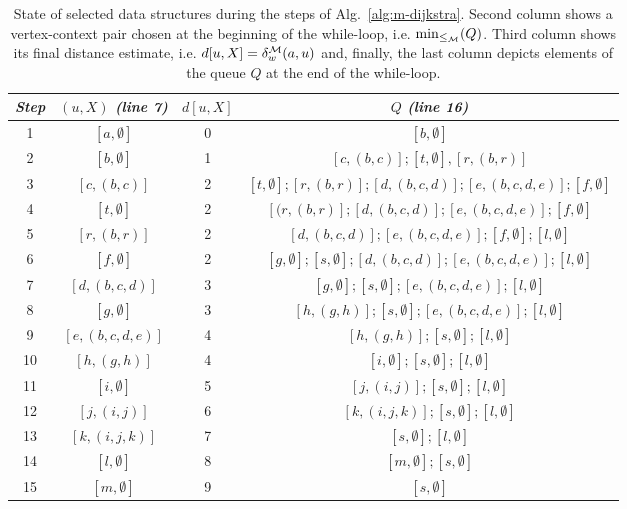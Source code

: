\documentclass[envcountsect,envcountsame]{llncs}
\begin{document}
\vspace{-2ex}
\begin{table}[H]
\label{tab:example}
\caption{State of selected data structures during the steps of 
Alg.~\ref{alg:m-dijkstra}. Second column shows a vertex-context pair chosen
at the beginning of the while-loop, i.e. $ \min_{\le_{\cal{M}}}(Q)$. Third column
shows its final distance estimate, i.e. $d[u,X]=\delta_w^{\cal{M}}(a,u)$ and,
finally, the last column depicts elements of the queue $Q$ at the end of 
the while-loop.}
\centering
\begin{tabular}{|@{~~}c@{~~}|@{~~}c@{~~}|@{~~}c@{~~}|@{~}c|}
\hline
\textit{Step} & $(u,X)$ \textit{(line 7)} & $d[u,X]$ & $Q$ \textit{(line 16)} \\[2pt]
\hline\hline
1 & $[a,\emptyset]$ & 0 & $[b,\emptyset]$ \\[2pt]
2 & $[b,\emptyset]$ & 1 & $[c,(b,c)]; [t,\emptyset],[r,(b,r)]$ \\[2pt]
3 & $[c,(b,c)]$ & 2 & $[t,\emptyset]; [r,(b,r)]; [d,(b,c,d)]; [e,(b,c,d,e)]; 
[f,\emptyset]$ \\[2pt]
4 & $[t,\emptyset]$ & 2 & $[(r,(b,r)]; [d,(b,c,d)]; [e,(b,c,d,e)]; [f,\emptyset]$ 
\\[2pt]
5 & $[r,(b,r)]$ & 2 & $[d,(b,c,d)]; [e,(b,c,d,e)]; [f,\emptyset]; [l,\emptyset]$ 
\\[2pt]
6 & $[f,\emptyset]$ & 2 & $[g,\emptyset]; [s,\emptyset]; [d,(b,c,d)]; 
[e,(b,c,d,e)]; [l,\emptyset]$ \\[2pt]
7 & $[d,(b,c,d)]$ & 3 & $[g,\emptyset]; [s,\emptyset]; [e,(b,c,d,e)]; 
[l,\emptyset]$ \\[2pt]
8 & $[g,\emptyset]$ & 3 & $[h,(g,h)]; [s,\emptyset]; [e,(b,c,d,e)]; [l,\emptyset]$ 
\\[2pt]
9 & $[e,(b,c,d,e)]$ & 4 & $[h,(g,h)]; [s,\emptyset]; [l,\emptyset]$ \\[2pt]
10 & $[h,(g,h)]$ & 4 & $[i,\emptyset]; [s,\emptyset]; [l,\emptyset]$ \\[2pt]
11 & $[i,\emptyset]$ & 5 & $[j,(i,j)]; [s,\emptyset]; [l,\emptyset]$ \\[2pt]
12 & $[j,(i,j)]$ & 6 & $[k,(i,j,k)]; [s,\emptyset]; [l,\emptyset]$ \\[2pt]
13 & $[k,(i,j,k)]$ & 7 & $[s,\emptyset]; [l,\emptyset]$ \\[2pt]
14 & $[l,\emptyset]$ & 8 & $[m,\emptyset]; [s,\emptyset]$ \\[2pt]
15 & $[m,\emptyset]$ & 9 & $[s,\emptyset]$ \\
\hline
\end{tabular}
\end{table}
\end{document}
